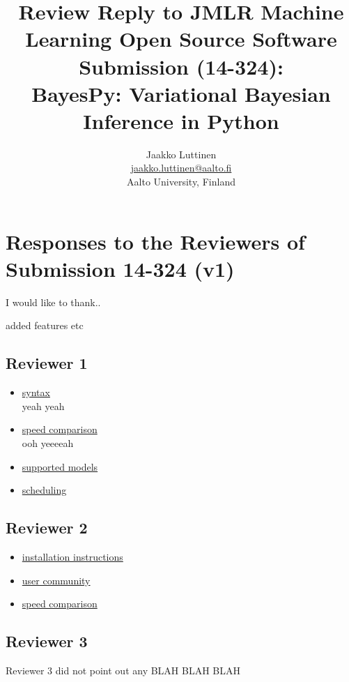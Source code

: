 \documentclass{article}
\title{Review Reply to JMLR Machine Learning Open Source Software Submission (14-324):\\
BayesPy: Variational Bayesian Inference in Python}
\author{Jaakko Luttinen\\
  \url{jaakko.luttinen@aalto.fi}\\
    Aalto University, Finland}
\begin{document}
\maketitle

\section{Responses to the Reviewers of Submission 14-324 (v1)}

I would like to thank..

added features etc







\subsection{Reviewer 1}

\begin{itemize}

\item \underline{syntax}\\
  yeah yeah

\item \underline{speed comparison}\\
  ooh yeeeeah

\item \underline{supported models}\\

\item \underline{scheduling}\\

\end{itemize}

\subsection{Reviewer 2}

\begin{itemize}

\item \underline{installation instructions}\\

\item \underline{user community}\\

\item \underline{speed comparison}

\end{itemize}

\subsection{Reviewer 3}

Reviewer 3 did not point out any BLAH BLAH BLAH
\end{document}
